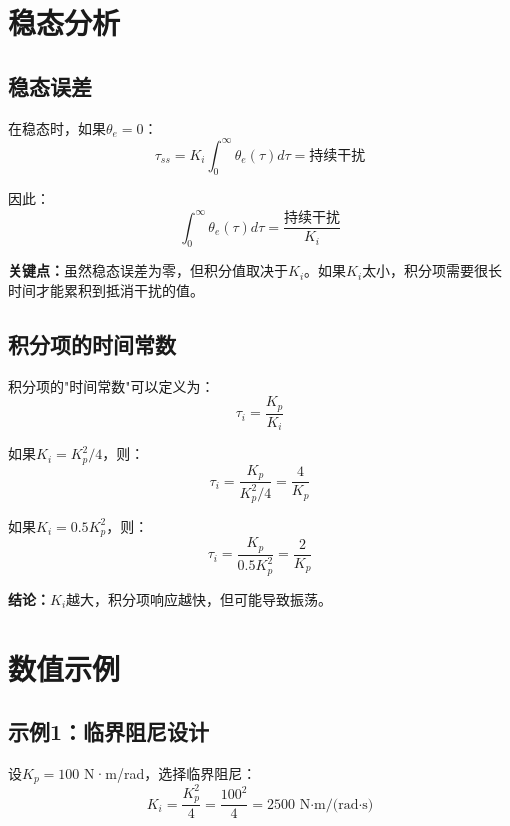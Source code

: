 \documentclass[12pt,a4paper]{article}
\begin{document}
\section{稳态分析}

\subsection{稳态误差}

在稳态时，如果$\theta_e = 0$：
\begin{equation}
\tau_{ss} = K_i \int_0^{\infty} \theta_e(\tau) d\tau = \text{持续干扰}
\end{equation}

因此：
\begin{equation}
\int_0^{\infty} \theta_e(\tau) d\tau = \frac{\text{持续干扰}}{K_i}
\end{equation}

\textbf{关键点：}虽然稳态误差为零，但积分值取决于$K_i$。如果$K_i$太小，积分项需要很长时间才能累积到抵消干扰的值。

\subsection{积分项的时间常数}

积分项的"时间常数"可以定义为：
\begin{equation}
\tau_i = \frac{K_p}{K_i}
\end{equation}

如果$K_i = K_p^2/4$，则：
\begin{equation}
\tau_i = \frac{K_p}{K_p^2/4} = \frac{4}{K_p}
\end{equation}

如果$K_i = 0.5 K_p^2$，则：
\begin{equation}
\tau_i = \frac{K_p}{0.5 K_p^2} = \frac{2}{K_p}
\end{equation}

\textbf{结论：}$K_i$越大，积分项响应越快，但可能导致振荡。

\section{数值示例}

\subsection{示例1：临界阻尼设计}

设$K_p = 100$ N·m/rad，选择临界阻尼：
\begin{equation}
K_i = \frac{K_p^2}{4} = \frac{100^2}{4} = 2500 \text{ N·m/(rad·s)}
\end{equation}
\end{document}
